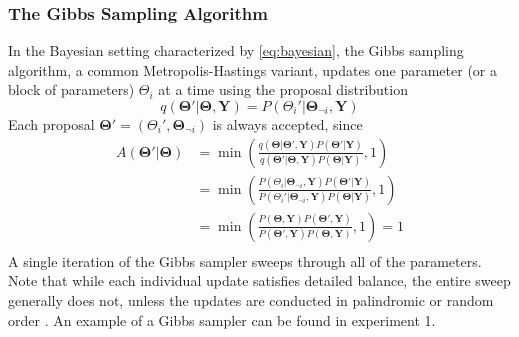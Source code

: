 \documentclass[a4paper,11pt]{article}
\begin{document}
\subsubsection{The Gibbs Sampling Algorithm}
In the Bayesian setting characterized by \eqref{eq:bayesian}, the Gibbs sampling algorithm, a common Metropolis-Hastings variant, updates one parameter (or a block of parameters) $\Theta_{i}$ at a time using the proposal distribution
\begin{equation}
    q(\mathbf{\Theta}'|\mathbf{\Theta}, \mathbf{Y}) = P(\Theta_{i}' | \mathbf{\Theta}_{\neg i}, \mathbf{Y})
\end{equation}
Each proposal $\mathbf{\Theta}' = (\Theta_{i}', \mathbf{\Theta}_{\neg i}) $ is always accepted, since
\begin{equation}
    \begin{aligned}
    A(\mathbf{\Theta}'|\mathbf{\Theta}) &= \min{\left(\frac{q(\mathbf{\Theta}|\mathbf{\Theta}', \mathbf{Y})  P(\mathbf{\Theta}'|\mathbf{Y}) }{q(\mathbf{\Theta}'|\mathbf{\Theta}, \mathbf{Y})  P(\mathbf{\Theta}| \mathbf{Y})}, 1\right)} \\
    &= \min{\left(\frac{P(\Theta_{i} | \mathbf{\Theta}_{\neg i}, \mathbf{Y})  P(\mathbf{\Theta}'|\mathbf{Y}) }{P(\Theta_{i}' | \mathbf{\Theta}_{\neg i}, \mathbf{Y})  P(\mathbf{\Theta}| \mathbf{Y})}, 1\right)} \\
    &= \min{\left(\frac{P(\mathbf{\Theta}, \mathbf{Y})  P(\mathbf{\Theta}', \mathbf{Y}) }{P(\mathbf{\Theta}', \mathbf{Y})  P(\mathbf{\Theta}, \mathbf{Y})}, 1\right)} = 1 \\
    \end{aligned}
\end{equation}
A single iteration of the Gibbs sampler sweeps through all of the parameters. Note that while each individual update satisfies detailed balance, the entire sweep generally does not, unless the updates are conducted in palindromic or random order \cite{geyer_practical_1992}. An example of a Gibbs sampler can be found in experiment 1.
\end{document}

